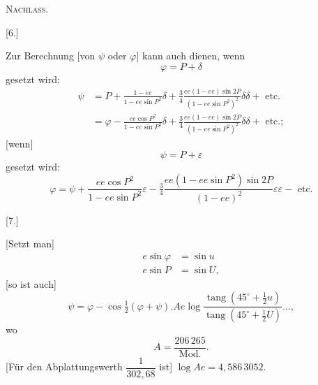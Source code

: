 \begingroup
\clearpage
{}\hfill\textsc{Nachlass.}\hfill\mbox{}\par\bigskip
\begin{center}[6.]\end{center}
Zur Berechnung [von $\psi$ oder $\varphi$] kann auch dienen, wenn
\[
\varphi=P+\delta
\]
gesetzt wird:
\[
\begin{aligned}
\psi&=P+\frac{1-ee}{1-ee\sin P^2}\delta+\tfrac34\frac{ee(1-ee)\sin2P}{(1-ee\sin P^2)^2}\delta\delta+\text{ etc.}\\[5pt]
&=\varphi-\frac{ee\cos P^2}{1-ee\sin P^2}\delta+\tfrac34\frac{ee(1-ee)\sin2P}{(1-ee\sin P^2)^2}\delta\delta+\text{ etc.};
\end{aligned}
\]
[wenn]
\[
\psi=P+\varepsilon
\]
gesetzt wird:
\[
\varphi=\psi+\frac{ee\cos P^2}{1-ee\sin P^2}\varepsilon-\tfrac34\frac{ee(1-ee\sin P^2)\sin2P}{(1-ee)^2}\varepsilon\varepsilon-\text{ etc.}
\]
\bigskip
\begin{center}[7.]\end{center}
[Setzt man]
\[
\begin{aligned}
e\sin\varphi&=\sin u\\
e\sin P&=\sin U,
\end{aligned}
\]
[so ist auch]
\[
\psi=\varphi-\cos\tfrac12(\varphi+\psi).Ae\log\frac{\operatorname{tang}(45^\circ+\frac12u)}{\operatorname{tang}(45^\circ+\frac12U)}\ldots,
\]
wo
\[
A=\frac{206\,265}{\mathrm{Mod.}}.
\]
[Für den Abplattungswerth $\dfrac1{302{,}68}$ ist] $\log Ae=4{,}586\,3052$.

